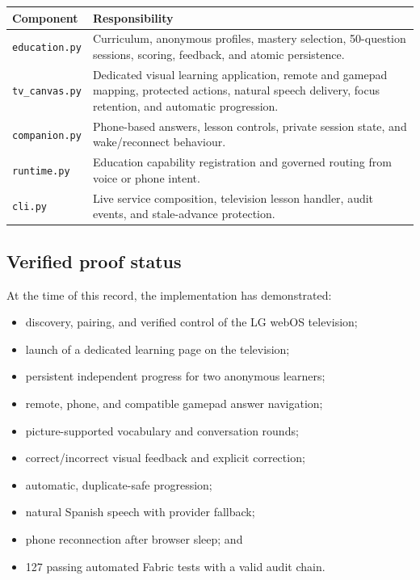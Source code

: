 \documentclass[11pt,a4paper]{article}
\begin{document}
\begin{table}[h]
\centering
\small
\begin{tabularx}{\textwidth}{@{}lX@{}}
\toprule
Component & Responsibility\\
\midrule
\texttt{education.py} & Curriculum, anonymous profiles, mastery selection,
50-question sessions, scoring, feedback, and atomic persistence.\\
\texttt{tv\_canvas.py} & Dedicated visual learning application, remote and
gamepad mapping, protected actions, natural speech delivery, focus retention,
and automatic progression.\\
\texttt{companion.py} & Phone-based answers, lesson controls, private session
state, and wake/reconnect behaviour.\\
\texttt{runtime.py} & Education capability registration and governed routing
from voice or phone intent.\\
\texttt{cli.py} & Live service composition, television lesson handler, audit
events, and stale-advance protection.\\
\bottomrule
\end{tabularx}
\end{table}

\subsection{Verified proof status}

At the time of this record, the implementation has demonstrated:

\begin{itemize}[leftmargin=*]
  \item discovery, pairing, and verified control of the LG webOS television;
  \item launch of a dedicated learning page on the television;
  \item persistent independent progress for two anonymous learners;
  \item remote, phone, and compatible gamepad answer navigation;
  \item picture-supported vocabulary and conversation rounds;
  \item correct/incorrect visual feedback and explicit correction;
  \item automatic, duplicate-safe progression;
  \item natural Spanish speech with provider fallback;
  \item phone reconnection after browser sleep; and
  \item 127 passing automated Fabric tests with a valid audit chain.
\end{itemize}
\end{document}
